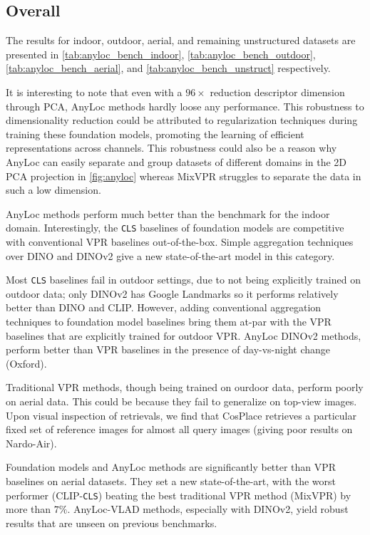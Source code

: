 \subsection{Overall}

The results for indoor, outdoor, aerial, and remaining unstructured
datasets are presented in \cref{tab:anyloc_bench_indoor},
\cref{tab:anyloc_bench_outdoor}, \cref{tab:anyloc_bench_aerial}, and
\cref{tab:anyloc_bench_unstruct} respectively. 

It is interesting to note that even with a $96\times$ reduction
descriptor dimension through PCA, AnyLoc methods hardly loose any
performance. This robustness to dimensionality reduction could be
attributed to regularization techniques during training these
foundation models, promoting the learning of efficient representations
across channels. This robustness could also be a reason why AnyLoc can
easily separate and group datasets of different domains in the 2D PCA 
projection in \cref{fig:anyloc} whereas MixVPR struggles to separate
the data in such a low dimension.

AnyLoc methods perform much better than the benchmark for the indoor
domain. Interestingly, the \texttt{CLS} baselines of foundation models
are competitive with conventional VPR baselines out-of-the-box. Simple
aggregation techniques over DINO and DINOv2 give a new
state-of-the-art model in this category.

Most \texttt{CLS} baselines fail in outdoor settings, due to not being
explicitly trained on outdoor data; only DINOv2 has Google Landmarks
so it performs relatively better than DINO and CLIP. However, adding
conventional aggregation techniques to foundation model baselines 
bring them at-par with the VPR baselines that are explicitly trained
for outdoor VPR. AnyLoc DINOv2 methods, perform better than VPR 
baselines in the presence of day-vs-night change (Oxford).

Traditional VPR methods, though being trained on ourdoor data, perform
poorly on aerial data. This could be because they fail to generalize
on top-view images. Upon visual inspection of retrievals, we find
that CosPlace retrieves a particular fixed set of reference images
for almost all query images (giving poor results on Nardo-Air).

Foundation models and AnyLoc methods are significantly better than VPR
baselines on aerial datasets. They set a new state-of-the-art, with
the worst performer (CLIP-\texttt{CLS}) beating the best traditional
VPR method (MixVPR) by more than $7\%$. AnyLoc-VLAD methods,
especially with DINOv2, yield robust results that are unseen on
previous benchmarks.

